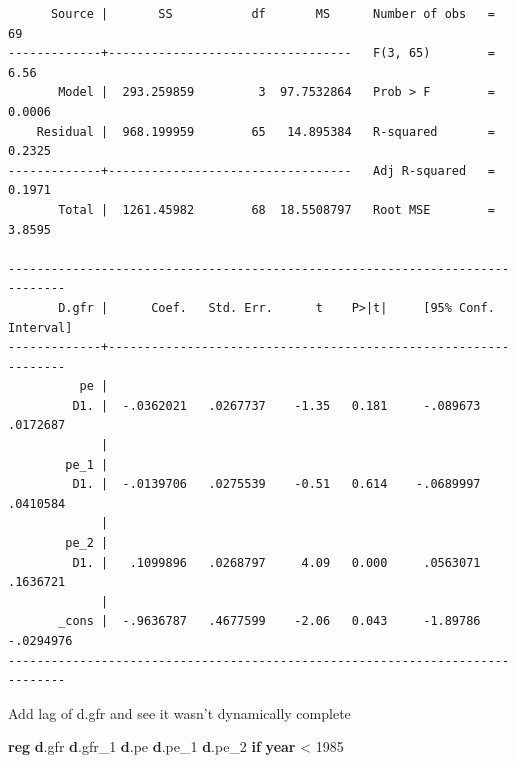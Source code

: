 \documentclass[
]{book}
\newenvironment{Shaded}{\begin{snugshade}}{\end{snugshade}}
\newcommand{\FunctionTok}[1]{\textcolor[rgb]{0.13,0.29,0.53}{\textbf{#1}}}
\newcommand{\KeywordTok}[1]{\textcolor[rgb]{0.13,0.29,0.53}{\textbf{#1}}}
\newcommand{\NormalTok}[1]{#1}
\begin{document}
\begin{verbatim}
      Source |       SS           df       MS      Number of obs   =        69
-------------+----------------------------------   F(3, 65)        =      6.56
       Model |  293.259859         3  97.7532864   Prob > F        =    0.0006
    Residual |  968.199959        65   14.895384   R-squared       =    0.2325
-------------+----------------------------------   Adj R-squared   =    0.1971
       Total |  1261.45982        68  18.5508797   Root MSE        =    3.8595

------------------------------------------------------------------------------
       D.gfr |      Coef.   Std. Err.      t    P>|t|     [95% Conf. Interval]
-------------+----------------------------------------------------------------
          pe |
         D1. |  -.0362021   .0267737    -1.35   0.181     -.089673    .0172687
             |
        pe_1 |
         D1. |  -.0139706   .0275539    -0.51   0.614    -.0689997    .0410584
             |
        pe_2 |
         D1. |   .1099896   .0268797     4.09   0.000     .0563071    .1636721
             |
       _cons |  -.9636787   .4677599    -2.06   0.043     -1.89786   -.0294976
------------------------------------------------------------------------------
\end{verbatim}

Add lag of d.gfr and see it wasn't dynamically complete

\begin{Shaded}
\begin{Highlighting}[]
\KeywordTok{reg} \KeywordTok{d}\NormalTok{.gfr }\KeywordTok{d}\NormalTok{.gfr\_1 }\KeywordTok{d}\NormalTok{.pe }\KeywordTok{d}\NormalTok{.pe\_1 }\KeywordTok{d}\NormalTok{.pe\_2 }\KeywordTok{if} \FunctionTok{year}\NormalTok{ \textless{} 1985}
\end{Highlighting}
\end{Shaded}
\end{document}
